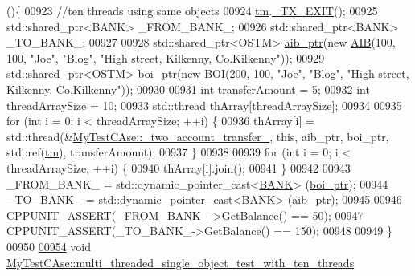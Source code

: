 \begin{DoxyCode}
      ()\{
00923     \textcolor{comment}{//ten threads using same objects}
00924     \hyperlink{class_my_test_c_ase_a422e6e5d4ddedea384be96031c89b72b_a422e6e5d4ddedea384be96031c89b72b}{tm}.\hyperlink{class_t_m_a5e2d1127f2429f2f524d25f430eade06_a5e2d1127f2429f2f524d25f430eade06}{\_TX\_EXIT}();
00925     std::shared\_ptr<BANK> \_FROM\_BANK\_;
00926     std::shared\_ptr<BANK> \_TO\_BANK\_;
00927     
00928     std::shared\_ptr<OSTM> \hyperlink{class_my_test_c_ase_adad50e8278b64aa0321000b528e5362c_adad50e8278b64aa0321000b528e5362c}{aib\_ptr}(\textcolor{keyword}{new} \hyperlink{class_a_i_b}{AIB}(100, 100, \textcolor{stringliteral}{"Joe"}, \textcolor{stringliteral}{"Blog"}, \textcolor{stringliteral}{"High street, Kilkenny,
       Co.Kilkenny"}));
00929     std::shared\_ptr<OSTM> \hyperlink{class_my_test_c_ase_a5554de9e3e6393a89c66c036c529720b_a5554de9e3e6393a89c66c036c529720b}{boi\_ptr}(\textcolor{keyword}{new} \hyperlink{class_b_o_i}{BOI}(200, 100, \textcolor{stringliteral}{"Joe"}, \textcolor{stringliteral}{"Blog"}, \textcolor{stringliteral}{"High street, Kilkenny,
       Co.Kilkenny"}));
00930     
00931     \textcolor{keywordtype}{int} transferAmount = 5;
00932     \textcolor{keywordtype}{int} threadArraySize = 10; 
00933     std::thread thArray[threadArraySize];
00934 
00935     \textcolor{keywordflow}{for} (\textcolor{keywordtype}{int} i = 0; i < threadArraySize; ++i) \{
00936         thArray[i] = std::thread(&\hyperlink{class_my_test_c_ase_af0cc86421d281cc4a583a394ae86dbdd_af0cc86421d281cc4a583a394ae86dbdd}{MyTestCAse::\_two\_account\_transfer\_}, \textcolor{keyword}{
      this}, aib\_ptr, boi\_ptr, std::ref(\hyperlink{class_my_test_c_ase_a422e6e5d4ddedea384be96031c89b72b_a422e6e5d4ddedea384be96031c89b72b}{tm}), transferAmount);
00937     \}
00938     
00939     \textcolor{keywordflow}{for} (\textcolor{keywordtype}{int} i = 0; i < threadArraySize; ++i) \{
00940         thArray[i].join();
00941     \}
00942     
00943     \_FROM\_BANK\_ = std::dynamic\_pointer\_cast<\hyperlink{class_b_a_n_k}{BANK}> (\hyperlink{class_my_test_c_ase_a5554de9e3e6393a89c66c036c529720b_a5554de9e3e6393a89c66c036c529720b}{boi\_ptr});
00944     \_TO\_BANK\_ = std::dynamic\_pointer\_cast<\hyperlink{class_b_a_n_k}{BANK}> (\hyperlink{class_my_test_c_ase_adad50e8278b64aa0321000b528e5362c_adad50e8278b64aa0321000b528e5362c}{aib\_ptr});
00945 
00946     CPPUNIT\_ASSERT(\_FROM\_BANK\_->GetBalance() == 50);
00947     CPPUNIT\_ASSERT(\_TO\_BANK\_->GetBalance() == 150);
00948     
00949 \}
00950 
\hypertarget{_my_test_c_ase_8cpp_source.tex_l00954}{}\hyperlink{class_my_test_c_ase_afea0c5983bf1fcc38d8962cfa6277da4_afea0c5983bf1fcc38d8962cfa6277da4}{00954} \textcolor{keywordtype}{void} \hyperlink{class_my_test_c_ase_afea0c5983bf1fcc38d8962cfa6277da4_afea0c5983bf1fcc38d8962cfa6277da4}{MyTestCAse::multi\_threaded\_single\_object\_test\_with\_ten\_threads}

\end{DoxyCode}
